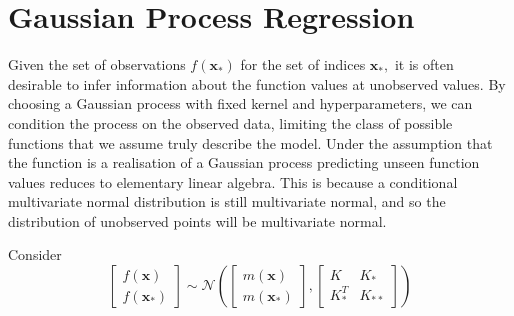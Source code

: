 \chapter{Gaussian Process Regression}

Given the set of observations $f(\mathbf{x}_*)$ for the set of indices
$\mathbf{x}_*,$ it is
often desirable to infer information about the function values at
unobserved values. By choosing a Gaussian process with fixed kernel and
hyperparameters, we
can condition the process on the observed data, limiting the class of
possible functions that we assume truly describe the model.
Under the assumption that the function is a realisation of a Gaussian
process predicting unseen function values reduces to elementary linear algebra.
This is because a conditional multivariate normal distribution
is still multivariate normal, and so the distribution of unobserved points will
be multivariate normal.

Consider
$$
    \begin{bmatrix}
        f(\mathbf{x}) \\
        f(\mathbf{x}_*)
    \end{bmatrix} \sim \mathcal{N}\left(
    \begin{bmatrix}
            m(\mathbf{x}) \\
            m(\mathbf{x}_*)
        \end{bmatrix}, \begin{bmatrix}
            K       & K_{*}  \\
            K_{*}^T & K_{**}
        \end{bmatrix}
    \right)
$$

